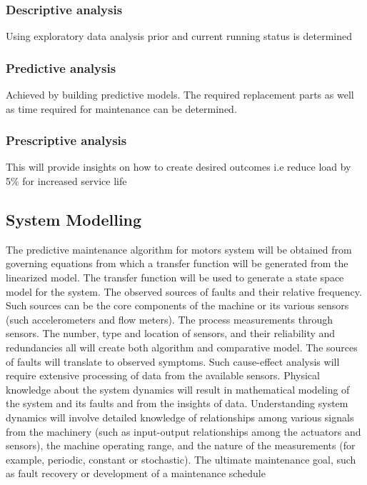 	\subsubsection{Descriptive analysis}
	Using exploratory data analysis prior and current running status is determined 
	
	\subsubsection{Predictive analysis}
	Achieved by building predictive models. The required replacement parts as well as time required for maintenance can be determined.
	
	\subsubsection{Prescriptive analysis}
	This will provide insights on how to create desired outcomes i.e reduce load by 5\% for increased service life 
	
\subsection{System Modelling}

The predictive maintenance algorithm for motors system will be obtained from governing
equations from which a transfer function will be generated from the linearized model. The
transfer function will be used to generate a state space model for the system.
The observed sources of faults and their relative frequency. Such sources can be the core
components of the machine or its various sensors (such accelerometers and flow meters).
The process measurements through sensors. The number, type and location of sensors,
and their reliability and redundancies all will create both algorithm and comparative
model.
The sources of faults will translate to observed symptoms. Such cause-effect analysis will
require extensive processing of data from the available sensors.
Physical knowledge about the system dynamics will result in mathematical modeling of
the system and its faults and from the insights of data. Understanding system dynamics
will involve detailed knowledge of relationships among various signals from the machinery
(such as input-output relationships among the actuators and sensors), the machine operating
range, and the nature of the measurements (for example, periodic, constant or stochastic).
The ultimate maintenance goal, such as fault recovery or development of a maintenance
schedule




